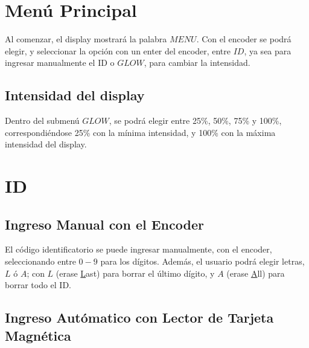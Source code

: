 \section{Menú Principal}

Al comenzar, el display mostrará la palabra $MENU$. 
Con el encoder se podrá elegir, y seleccionar la opción con un enter del encoder, entre $ID$, 
ya sea para ingresar manualmente el ID o $GLOW$, para cambiar la intensidad.

\subsection{Intensidad del display}

Dentro del submenú $GLOW$, se podrá elegir entre 25\%, 50\%, 75\% y 100\%, 
correspondiéndose 25\% con la mínima intensidad, y 100\% con la máxima intensidad del display.

\section{ID}
\subsection{Ingreso Manual con el Encoder}
El código identificatorio se puede ingresar manualmente, con el encoder, 
seleccionando entre $0-9$ para los dígitos. Además, el usuario podrá elegir letras, $L$ ó $A$;
con $L$ (erase \underline{L}ast) para borrar el último dígito, y $A$ (erase \underline{A}ll)
 para borrar todo el ID.

 \subsection{Ingreso Autómatico con Lector de Tarjeta Magnética}
 

